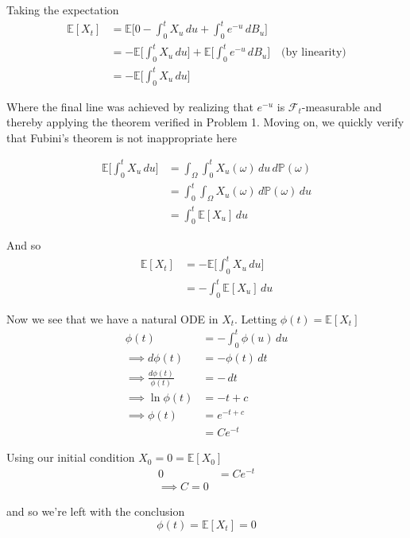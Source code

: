 \documentclass[12pt]{article}
\newlength\tindent
\renewcommand{\indent}{\hspace*{\tindent}}
\begin{document}
Taking the expectation 
\begin{align*}
	\mathbb E[X_t] &= \mathbb E\Big[0- \int^t_0 X_u \,du + \int^t_0 e^{-u}\,dB_u\Big] \\
	&= - \mathbb E\Big[\int^t_0 X_u \,du\Big] + \mathbb E\Big[\int^t_0 e^{-u}\,dB_u\Big] \quad \text{(by linearity)} \\
	&= - \mathbb E\Big[\int^t_0 X_u \,du\Big] 
\end{align*}

\indent Where the final line was achieved by realizing that $e^{-u}$ is $\mathcal F_t$-measurable and thereby applying the theorem verified in Problem 1. Moving on, we quickly verify that Fubini's theorem is not inappropriate here

\begin{align*}
	\mathbb E\Big[\int^t_0 X_u\,du \Big] &= \int_\Omega \int^t_0 X_u(\omega) \,du\,d\mathbb P(\omega) \\
	&= \int^t_0 \int_\Omega X_u(\omega) \,d\mathbb P(\omega)\,du \\
	&= \int^t_0 \mathbb E[X_u]\,du
\end{align*}

And so
\begin{align*}
	\mathbb E[X_t] &= -\mathbb E\Big[\int^t_0 X_u \,du\Big] \\
	&= -\int^t_0 \mathbb E[X_u]\,du
\end{align*}

Now we see that we have a natural ODE in $X_t$. Letting $\phi(t) = \mathbb E[X_t]$
\begin{align*}
	\phi(t) &= -\int^t_0 \phi(u)\,du \\
	\implies d\phi(t) &= -\phi(t)\,dt \\
	\implies \frac{d\phi(t)}{\phi(t)} &= -\,dt \\
	\implies \ln \phi(t) &= -t + c \\
	\implies \phi(t) &= e^{-t + c} \\
	&= Ce^{-t}
\end{align*}

Using our initial condition $X_0 = 0 = \mathbb E[X_0]$
\begin{align*}
	0 &= Ce^{-t} \\
	\implies C = 0
\end{align*}

and so we're left with the conclusion
\begin{equation*}
	\phi(t) = \mathbb E[X_t] = 0
\end{equation*}
\end{document}
